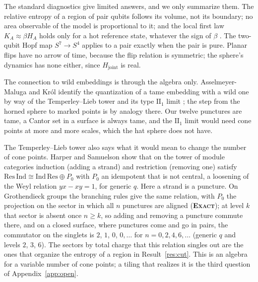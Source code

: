 \documentclass[11pt]{article}
\newcommand{\exact}{\textbf{\textsc{Exact}}}
\theoremstyle{definition}
\begin{document}
The standard diagnostics give limited answers, and we only summarize them. The relative entropy of a region of pair qubits follows its volume, not its boundary; no area observable of the model is proportional to it; and the local first law $K_A\approx\beta H_A$ holds only for a hot reference state, whatever the sign of $\beta$ \cite{doraumuch}. The two-qubit Hopf map $S^7\to S^4$ applies to a pair exactly when the pair is pure. Planar flips have no arrow of time, because the flip relation is symmetric; the sphere's dynamics has none either, since $H_{\mathrm{joint}}$ is real.

The connection to wild embeddings is through the algebra only. Asselmeyer-Maluga and Kr\'ol identify the quantization of a tame embedding with a wild one by way of the Temperley--Lieb tower and its type $\mathrm{II}_1$ limit \cite{asselmeyer2013,jones1983}; the step from the horned sphere to marked points is by analogy there. Our twelve punctures are tame, a Cantor set in a surface is always tame, and the $\mathrm{II}_1$ limit would need cone points at more and more scales, which the hat sphere does not have.

The Temperley--Lieb tower also says what it would mean to change the number of cone points. Harper and Samuelson \cite{harper2024} show that on the tower of module categories induction (adding a strand) and restriction (removing one) satisfy $\mathrm{Res}\,\mathrm{Ind}\cong\mathrm{Ind}\,\mathrm{Res}\oplus P_0$ with $P_0$ an idempotent that is not central, a loosening of the Weyl relation $yx-xy=1$, for generic $q$. Here a strand is a puncture. On Grothendieck groups the branching rules give the same relation, with $P_0$ the projection on the sector in which all $n$ punctures are aligned (\exact); at level $k$ that sector is absent once $n\ge k$, so adding and removing a puncture commute there, and on a closed surface, where punctures come and go in pairs, the commutator on the singlets is $2$, $1$, $0$, $0,\dots$ for $n=0,2,4,6,\dots$ (generic $q$ and levels $2$, $3$, $6$). The sectors by total charge that this relation singles out are the ones that organize the entropy of a region in Result~\ref{res:cut}. This is an algebra for a variable number of cone points; a tiling that realizes it is the third question of Appendix~\ref{app:open}.
\end{document}
